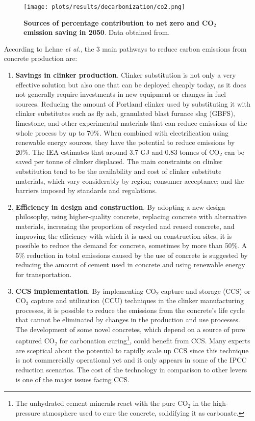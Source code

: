 \begin{figure}[ht!]
  \centering
  \texttt{[image: plots/results/decarbonization/co2.png]}
  \caption[Sources of percentage contribution to net zero and CO$_2$ emission saving in 2050]{\textbf{Sources of percentage contribution to net zero and CO$_2$ emission saving in 2050}. Data obtained from.\autocite{aus_2022}}
  \label{fig:co2}
\end{figure}

According to Lehne \textit{et al.},\autocite{lehne2018making} the 3 main pathways to reduce carbon emissions from concrete production are:

\begin{enumerate}
\item \textbf{Savings in clinker production}. Clinker substitution is not only a very effective solution but also one that can be deployed cheaply today, as it does not generally require investments in new equipment or changes in fuel sources.\autocite{lehne2018making} Reducing the amount of Portland clinker used by substituting it with clinker substitutes such as fly ash, granulated blast furnace slag (GBFS), limestone, and other experimental materials that can reduce emissions of the whole process by up to 70\%. When combined with electrification using renewable energy sources, they have the potential to reduce emissions by 20\%. The IEA estimates that around 3.7 GJ and 0.83 tonnes of CO$_2$ can be saved per tonne of clinker displaced.\autocite{iea2017energy} The main constraints on clinker substitution tend to be the availability and cost of clinker substitute materials, which vary considerably by region; consumer acceptance; and the barriers imposed by standards and regulations.\autocite{imbabi2012trends}
\item \textbf{Efficiency in design and construction}. By adopting a new design philosophy, using higher-quality concrete, replacing concrete with alternative materials, increasing the proportion of recycled and reused concrete, and improving the efficiency with which it is used on construction sites, it is possible to reduce the demand for concrete, sometimes by more than 50\%.\autocite{lehne2018making} A 5\% reduction in total emissions caused by the use of concrete is suggested by reducing the amount of cement used in concrete and using renewable energy for transportation.\autocite{aus_2022} 
\item \textbf{CCS implementation}. By implementing CO$_2$ capture and storage (CCS) or CO$_2$ capture and utilization (CCU) techniques in the clinker manufacturing processes, it is possible to reduce the emissions from the concrete's life cycle that cannot be eliminated by changes in the production and use processes. The development of some novel concretes, which depend on a source of pure captured CO$_2$ for carbonation curing\footnote{The unhydrated cement minerals react with the pure CO$_2$ in the high-pressure atmosphere used to cure the concrete, solidifying it as carbonate.}, could benefit from CCS. Many experts are sceptical about the potential to rapidly scale up CCS since this technique is not commercially operational yet and it only appears in some of the IPCC reduction scenarios. The cost of the technology in comparison to other levers is one of the major issues facing CCS.

\end{enumerate}
